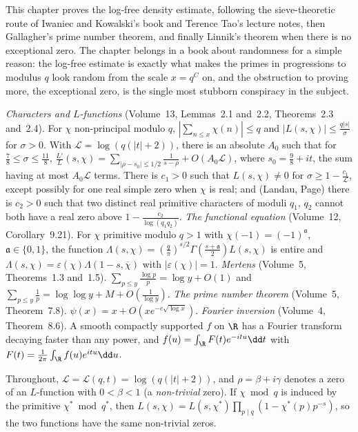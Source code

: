 This chapter proves the log-free density estimate, following the sieve-theoretic route of Iwaniec and Kowalski's book and Terence Tao's lecture notes, then Gallagher's prime number theorem, and finally Linnik's theorem when there is no exceptional zero. The chapter belongs in a book about randomness for a simple reason: the log-free estimate is exactly what makes the primes in progressions to modulus $q$ look random from the scale $x=q^{C}$ on, and the obstruction to proving more, the exceptional zero, is the single most stubborn conspiracy in the subject.

\begin{reminder}
\emph{Characters and $L$-functions} (Volume~13, Lemmas~2.1 and~2.2, Theorems~2.3 and~2.4). For $\chi$ non-principal modulo $q$, $|\sum_{n\le x}\chi(n)|\le q$ and $|L(s,\chi)|\le\frac{q|s|}\sigma$ for $\sigma>0$. With $\mathcal L=\log(q(|t|+2))$, there is an absolute $A_0$ such that for $\frac78\le\sigma\le\frac{11}8$, $\frac{L'}L(s,\chi)=\sum_{|\rho-s_0|\le1/2}\frac1{s-\rho}+O(A_0\mathcal L)$, where $s_0=\frac98+it$, the sum having at most $A_0\mathcal L$ terms. There is $c_1>0$ such that $L(s,\chi)\ne0$ for $\sigma\ge1-\frac{c_1}{\mathcal L}$, except possibly for one real simple zero when $\chi$ is real; and (Landau, Page) there is $c_2>0$ such that two distinct real primitive characters of moduli $q_1$, $q_2$ cannot both have a real zero above $1-\frac{c_2}{\log(q_1q_2)}$.
\emph{The functional equation} (Volume~12, Corollary~9.21). For $\chi$ primitive modulo $q>1$ with $\chi(-1)=(-1)^{\mathfrak a}$, $\mathfrak a\in\{0,1\}$, the function $\Lambda(s,\chi)=(\frac q\pi)^{s/2}\Gamma(\frac{s+\mathfrak a}2)L(s,\chi)$ is entire and $\Lambda(s,\chi)=\varepsilon(\chi)\Lambda(1-s,\overline\chi)$ with $|\varepsilon(\chi)|=1$.
\emph{Mertens} (Volume~5, Theorems~1.3 and~1.5). $\sum_{p\le y}\frac{\log p}p=\log y+O(1)$ and $\sum_{p\le y}\frac1p=\log\log y+M+O(\frac1{\log y})$.
\emph{The prime number theorem} (Volume~5, Theorem~7.8). $\psi(x)=x+O(xe^{-c\sqrt{\log x}})$.
\emph{Fourier inversion} (Volume~4, Theorem~8.6). A smooth compactly supported $f$ on $\R$ has a Fourier transform decaying faster than any power, and $f(u)=\int_\R F(t)e^{-itu}\dd t$ with $F(t)=\frac1{2\pi}\int_\R f(u)e^{itu}\dd u$.
\end{reminder}

Throughout, $\mathcal L=\mathcal L(q,t)=\log(q(|t|+2))$, and $\rho=\beta+i\gamma$ denotes a zero of an $L$-function with $0<\beta<1$ (a \emph{non-trivial} zero). If $\chi\bmod q$ is induced by the primitive $\chi^*\bmod q^*$, then $L(s,\chi)=L(s,\chi^*)\prod_{p\mid q}(1-\chi^*(p)p^{-s})$, so the two functions have the same non-trivial zeros.

